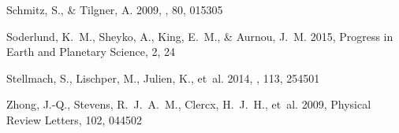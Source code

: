 \documentclass[twocolumn, amsmath, amsfonts, amssymb, trackchanges]{aastex62}
\begin{document}
\begin{thebibliography}{}
{Schmitz}, S., \& {Tilgner}, A. 2009, \pre, 80, 015305

{Soderlund}, K.~M., {Sheyko}, A., {King}, E.~M., \& {Aurnou}, J.~M. 2015,
  Progress in Earth and Planetary Science, 2, 24

{Stellmach}, S., {Lischper}, M., {Julien}, K., {et~al.} 2014, \prl, 113, 254501

{Zhong}, J.-Q., {Stevens}, R.~J.~A.~M., {Clercx}, H.~J.~H., {et~al.} 2009,
  Physical Review Letters, 102, 044502

\end{thebibliography}
\end{document}
